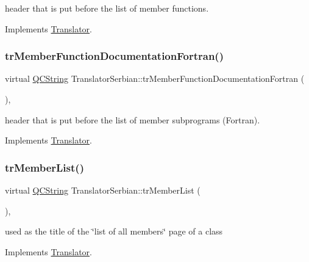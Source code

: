 header that is put before the list of member functions. 

Implements \mbox{\hyperlink{class_translator}{Translator}}.

\mbox{\label{class_translator_serbian_a14c5d46965f6052ba96365c678305b89}} 
\subsubsection{\texorpdfstring{trMemberFunctionDocumentationFortran()}{trMemberFunctionDocumentationFortran()}}
{\footnotesize\ttfamily virtual \mbox{\hyperlink{class_q_c_string}{Q\+C\+String}} Translator\+Serbian\+::tr\+Member\+Function\+Documentation\+Fortran (\begin{DoxyParamCaption}{ }\end{DoxyParamCaption})\hspace{0.3cm}{\ttfamily [inline]}, {\ttfamily [virtual]}}

header that is put before the list of member subprograms (Fortran). 

Implements \mbox{\hyperlink{class_translator}{Translator}}.

\mbox{\label{class_translator_serbian_afc1617db2d722bde370d4e0844319c5e}} 
\subsubsection{\texorpdfstring{trMemberList()}{trMemberList()}}
{\footnotesize\ttfamily virtual \mbox{\hyperlink{class_q_c_string}{Q\+C\+String}} Translator\+Serbian\+::tr\+Member\+List (\begin{DoxyParamCaption}{ }\end{DoxyParamCaption})\hspace{0.3cm}{\ttfamily [inline]}, {\ttfamily [virtual]}}

used as the title of the \char`\"{}list of all members\char`\"{} page of a class 

Implements \mbox{\hyperlink{class_translator}{Translator}}.

